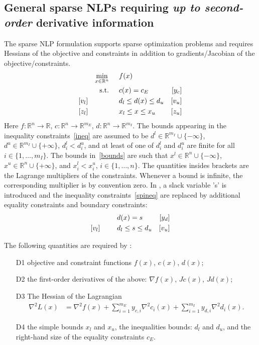\subsection{General sparse NLPs requiring \textit{up to second-order} derivative information}
The sparse NLP formulation supports sparse optimization problems and requires Hessians of the objective and constraints in addition to gradients/Jacobian of the objective/constraints.
\begin{align}
&&&&\min_{x\in\mathbb{R}^n} & \hspace{0.5cm} f(x) &&&& \label{spobj}\\
&&&&\textnormal{s.t.} &\hspace{0.5cm}  c(x)=c_E &[y_c]&&&\\
&&[v_l]&&& \hspace{0.5cm} d_l \leq d(x) \leq d_u  &[v_u]&&&\label{spineq} \\
&&[z_l]&&& \hspace{0.5cm} x_l \leq x \leq x_u & [z_u] &&&\label{spbounds}
\end{align}
Here $f:\mathbb{R}^n\rightarrow\mathbb{R}$, $c:\mathbb{R}^n\rightarrow\mathbb{R}^{m_E}$, $d:\mathbb{R}^n\rightarrow\mathbb{R}^{m_I}$. The bounds appearing in the inequality constraints~\eqref{ineq} are assumed to be $d^l\in\mathbb{R}^{m_I}\cup\{-\infty\}$, $d^u\in\mathbb{R}^{m_I}\cup\{+\infty\}$, $d_i^l < d_i^u$, and at least of one of $d_i^l$ and $d_i^u$ are finite for all $i\in\{1,\ldots,m_I\}$. The bounds in~\eqref{bounds} are such that $x^l\in\mathbb{R}^{n}\cup\{-\infty\}$, $x^u\in\mathbb{R}^{n}\cup\{+\infty\}$, and $x_i^l < x_i^u$, $i\in\{1,\ldots,n\}$. The quantities insides brackets are the Lagrange multipliers of the constraints. Whenever a bound is infinite, the corresponding multiplier is by convention zero.
In \Hi, a slack variable 's' is introduced and the inequality constraints~\eqref{spineq} are replaced by additional equality constraints and boundary constraints:
\begin{align}
&&&&& \hspace{0.5cm} d(x) = s &[y_d]&&& \\
&&[v_l]&&& \hspace{0.5cm} d_l \leq s \leq d_u  &[v_u]&&&\label{spineq_s} 
\end{align}

The following quantities are required by \Hi:
\begin{itemize}
\item[D1] objective and constraint functions $f(x)$, $c(x)$, $d(x)$;
\item[D2] the first-order derivatives of the above: $\nabla f(x)$, $Jc(x)$, $Jd(x)$;
\item[D3] The Hessian of the Lagrangian
  \begin{align}
\nabla^2 L(x)& = \nabla^2 f(x) + \sum_{i=1}^{m_E} y_{c,i} \nabla^2 c_i(x) + \sum_{i=1}^{m_I} y_{d,i} \nabla^2 d_i(x).\label{spHess}
\end{align}
\item[D4] the simple bounds $x_l$ and $x_u$, the inequalities bounds: $d_l$ and $d_u$, and the right-hand size of the equality constraints $c_E$.
\end{itemize}

